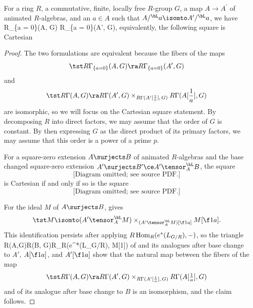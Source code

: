 \blem \label{prop:excision-prep}
For a ring $R$, a commutative, finite, locally free $R$-group $G$, a map $A\to A^\prime$ of animated $R$-algebras, and an $a\in A$ such that $A/^\bL a \isomto A^\prime/^\bL a$, %
we have
\be \label{eqn:excision-prep-supp}
R\Gamma_{\{a = 0\}}(A, G) \isomto R\Gamma_{\{a = 0\}}(A', G),
\ee
equivalently,  the following square is Cartesian\ucolon
\be \label{eqn:exicision-prep-square} \ba{}
\ea\ee
\elem

\begin{proof}
The two formulations are equivalent because the fibers of the maps
\[
\tst R\Gamma_{\{a = 0\}}(A, G) \ra R\Gamma_{\{a = 0\}}(A', G)
\]
and
\[
\tst R\Gamma(A,G) \ra R\Gamma(A^\prime,G) \times_{R\Gamma(A^\prime[\frac 1a],\,G)} R\Gamma(A[\frac 1a],G)
\]
are isomorphic, %
so we will focus on the Cartesian square statement. By decomposing $R$ into direct factors, we may assume that the order of $G$ is constant. By then expressing $G$ as the direct product of its primary factors, we may assume that this order is a power of a prime $p$.

\begin{claim}
\notready \label{claim:def-theoretic-reduction}
For a square-zero extension $A\surjects B$ of animated $R$-algebras and the base changed square-zero extension $A' \surjects B' \ce A' \tensor_A^\bL B$, the square
\[\text{[Diagram omitted; see source PDF.]}
\]
is Cartesian if and only if so is the square
\[\text{[Diagram omitted; see source PDF.]}
\]
\end{claim}

\bpf
For the ideal $M$ of $A\surjects B$,  gives
\[
\tst M\isomto (A' \tensor^\bL_A M) \times_{(A' \tensor^\bL_A M)[\f 1a]} M[\f 1a].
\]
This identification persists after applying $R\operatorname{Hom}_R(e^*(L_{G/R}), -)$, so the  triangle
\be \label{eqn:def-theoretic-triangle-middle-of-pf}
R\Gamma(A,G)\to R\Gamma(B, G)\to R\Hom_R(e^*(L_{G/R}), M[1])
\ee
of  and its analogues after base change to $A'$, $A[\f 1a]$, and $A'[\f 1a]$ show that the natural map between the fibers of the map
\[
\tst R\Gamma(A,G) \ra R\Gamma(A^\prime,G) \times_{R\Gamma(A^\prime[\frac 1a],\,G)} R\Gamma(A[\tfrac 1a],G)
\]
and of its analogue after base change to $B$ is an isomorphism, %
and the claim follows.


\end{proof}
